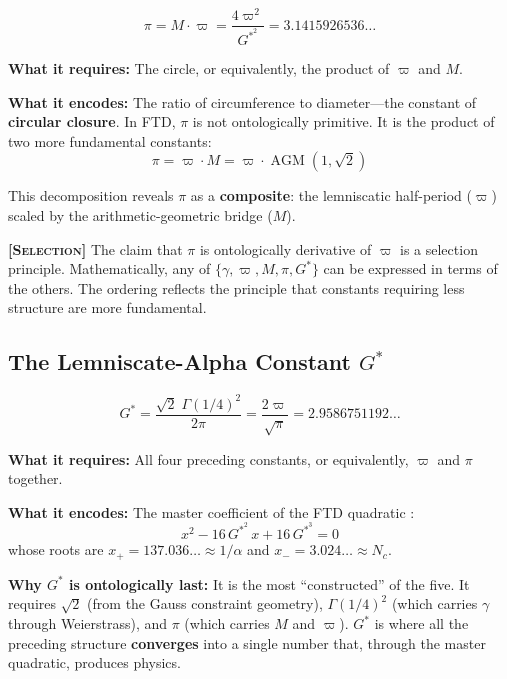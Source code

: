 \documentclass[11pt, letterpaper]{article}
\newcommand{\G}{G^*}
\DeclareMathOperator{\AGM}{AGM}
\theoremstyle{definition}
\theoremstyle{remark}
\newcommand{\epi}[1]{\textbf{\textsc{[#1]}}}
\begin{document}
\begin{equation}
    \pi = M \cdot \varpi = \frac{4\varpi^2}{\G^{2}} = 3.1415926536\dots
\end{equation}

\noindent\textbf{What it requires:} The circle, or equivalently, the product of $\varpi$ and $M$.

\noindent\textbf{What it encodes:} The ratio of circumference to diameter---the constant of \textbf{circular closure}. In FTD, $\pi$ is not ontologically primitive. It is the product of two more fundamental constants:
\begin{equation}
    \pi = \varpi \cdot M = \varpi \cdot \AGM(1, \sqrt{2})
\end{equation}

This decomposition reveals $\pi$ as a \textbf{composite}: the lemniscatic half-period ($\varpi$) scaled by the arithmetic-geometric bridge ($M$).

\epi{Selection} The claim that $\pi$ is ontologically derivative of $\varpi$ is a selection principle. Mathematically, any of $\{\gamma, \varpi, M, \pi, \G\}$ can be expressed in terms of the others. The ordering reflects the principle that constants requiring less structure are more fundamental.

\subsection{The Lemniscate-Alpha Constant $\G$}

\begin{equation}
    \G = \frac{\sqrt{2}\;\Gamma(1/4)^2}{2\pi} = \frac{2\varpi}{\sqrt{\pi}} = 2.9586751192\dots
\end{equation}

\noindent\textbf{What it requires:} All four preceding constants, or equivalently, $\varpi$ and $\pi$ together.

\noindent\textbf{What it encodes:} The master coefficient of the FTD quadratic \cite{cpaci-tani2026_Zenodo}:
\begin{equation}
    x^2 - 16\,\G^{2}\,x + 16\,\G^{3} = 0
\end{equation}
whose roots are $x_+ = 137.036\ldots \approx 1/\alpha$ and $x_- = 3.024\ldots \approx N_c$.

\noindent\textbf{Why $\G$ is ontologically last:} It is the most ``constructed'' of the five. It requires $\sqrt{2}$ (from the Gauss constraint geometry), $\Gamma(1/4)^2$ (which carries $\gamma$ through Weierstrass), and $\pi$ (which carries $M$ and $\varpi$). $\G$ is where all the preceding structure \textbf{converges} into a single number that, through the master quadratic, produces physics.
\end{document}
